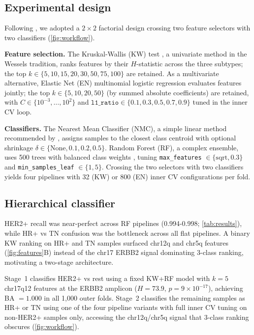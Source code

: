 \documentclass[11pt,a4paper,twocolumn]{article}
\begin{document}
\subsection{Experimental design}
\label{sec:design}

Following \citet{wessels2005protocol}, we adopted a $2 \times 2$ factorial design crossing two feature selectors with two classifiers (\autoref{fig:workflow}).

\textbf{Feature selection.} The Kruskal-Wallis (KW) test \citep{kruskalwallis1952}, a univariate method in the Wessels tradition, ranks features by their $H$-statistic across the three subtypes; the top \mbox{$k \in \{5,10,15,20,30,50,75,100\}$} are retained. As a multivariate alternative, Elastic Net (EN) multinomial logistic regression \citep{zou2005elasticnet} evaluates features jointly; the top $k \in \{5,10,20,50\}$ (by summed absolute coefficients) are retained, with $C \in \{10^{-3}, \ldots, 10^{2}\}$ and $\texttt{l1\_ratio} \in \{0.1, 0.3, 0.5, 0.7, 0.9\}$ tuned in the inner CV loop.

\textbf{Classifiers.} The Nearest Mean Classifier (NMC), a simple linear method recommended by \citet{wessels2005protocol}, assigns samples to the closest class centroid with optional shrinkage $\delta \in \{\text{None}, 0.1, 0.2, 0.5\}$. Random Forest (RF), a complex ensemble, uses 500 trees with balanced class weights \citep{breiman2001random}, tuning \texttt{max\_features} $\in \{\text{sqrt}, 0.3\}$ and \texttt{min\_samples\_leaf} $\in \{1, 5\}$. Crossing the two selectors with two classifiers yields four pipelines with 32 (KW) or 800 (EN) inner CV configurations per fold.

\subsection{Hierarchical classifier}
\label{sec:hierarchical}

HER2+ recall was near-perfect across RF pipelines (0.994-0.998; \autoref{tab:results}), while HR+ vs TN confusion was the bottleneck across all flat pipelines. A binary KW ranking on HR+ and TN samples surfaced chr12q and chr5q features (\autoref{fig:features}B) instead of the chr17 ERBB2 signal dominating 3-class ranking, motivating a two-stage architecture.

Stage~1 classifies HER2+ vs rest using a fixed KW+RF model with $k = 5$ chr17q12 features at the ERBB2 amplicon ($H = 73.9$, $p = 9 \times 10^{-17}$), achieving BA $= 1.000$ in all 1,000 outer folds. Stage~2 classifies the remaining samples as HR+ or TN using one of the four pipeline variants with full inner CV tuning on non-HER2+ samples only, accessing the chr12q/chr5q signal that 3-class ranking obscures (\autoref{fig:workflow}).
\end{document}
